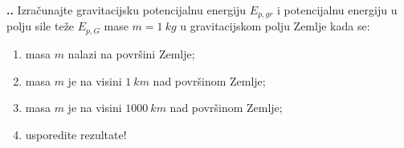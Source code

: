 

\noindent 
\textbf{
\thecjelina.\thezadatak.}
Izračunajte gravitacijsku potencijalnu energiju $E_{p,gr}$ i potencijalnu energiju u polju sile
teže $E_{p,G}$ mase $m = 1\ kg$ u gravitacijskom polju Zemlje kada se:

\begin{enumerate}[label=\alph*)]
  \item masa $m$ nalazi na površini Zemlje;
  \item masa $m$ je na visini $1\ km$ nad površinom Zemlje;
\item masa $m$ je na visini $1000\ km$ nad površinom Zemlje;
\item usporedite rezultate!
\end{enumerate}

